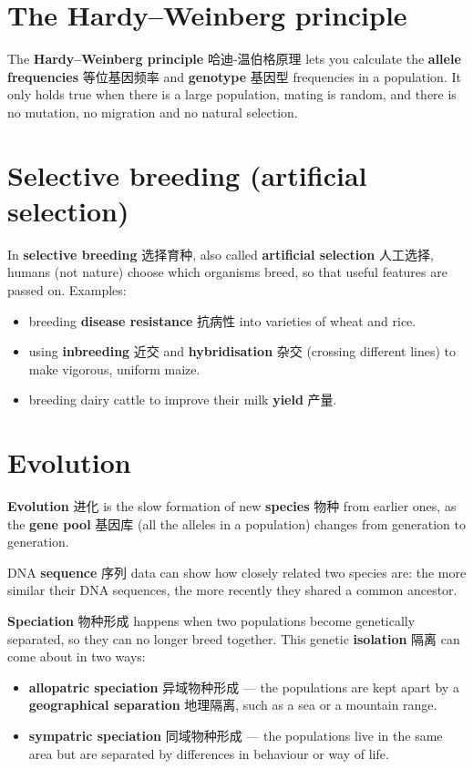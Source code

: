 \documentclass[11pt]{article}
\begin{document}
\section*{The Hardy–Weinberg principle}

The \textbf{Hardy–Weinberg principle} 哈迪-温伯格原理 lets you calculate the \textbf{allele frequencies} 等位基因频率 and \textbf{genotype} 基因型 frequencies in a population. It only holds true when there is a large population, mating is random, and there is no mutation, no migration and no natural selection.

\section*{Selective breeding (artificial selection)}

In \textbf{selective breeding} 选择育种, also called \textbf{artificial selection} 人工选择, humans (not nature) choose which organisms breed, so that useful features are passed on. Examples:

\begin{itemize}
\item breeding \textbf{disease resistance} 抗病性 into varieties of wheat and rice.

\item using \textbf{inbreeding} 近交 and \textbf{hybridisation} 杂交 (crossing different lines) to make vigorous, uniform maize.

\item breeding dairy cattle to improve their milk \textbf{yield} 产量.

\end{itemize}

\section*{Evolution}

\textbf{Evolution} 进化 is the slow formation of new \textbf{species} 物种 from earlier ones, as the \textbf{gene pool} 基因库 (all the alleles in a population) changes from generation to generation.

DNA \textbf{sequence} 序列 data can show how closely related two species are: the more similar their DNA sequences, the more recently they shared a common ancestor.

\textbf{Speciation} 物种形成 happens when two populations become genetically separated, so they can no longer breed together. This genetic \textbf{isolation} 隔离 can come about in two ways:

\begin{itemize}
\item \textbf{allopatric speciation} 异域物种形成 — the populations are kept apart by a \textbf{geographical separation} 地理隔离, such as a sea or a mountain range.

\item \textbf{sympatric speciation} 同域物种形成 — the populations live in the same area but are separated by differences in behaviour or way of life.

\end{itemize}
\end{document}
